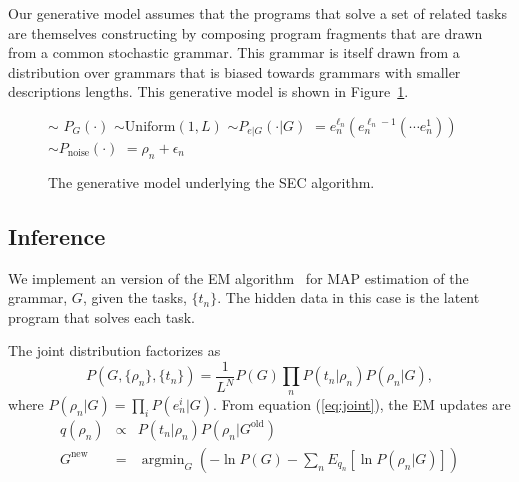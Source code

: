 \documentclass{article} %
\begin{document}
Our generative model assumes that the programs that solve a set of related tasks are themselves constructing by composing program fragments that are drawn from a common stochastic grammar. This grammar is itself drawn from a distribution over grammars that is biased towards grammars with smaller descriptions lengths. This generative model is shown in Figure~\ref{ref:gm}.

\begin{figure}
\begin{codebox}
 $\sim$ $P_G(\cdot)$ 
\li {} $\sim\mbox{Uniform}(1, L)$ 
\li {}
\li {} $\sim P_{e|G}(\cdot | G)$
\li {} $= e_n^{\ell_n} (e_n^{\ell_n-1} ( \cdots e_n^{1}))$
\li {}
\li {} $\sim P_{\mbox{noise}}(\cdot)$
\li {} $= \rho_n + \epsilon_n$
\end{codebox}
\caption{The generative model underlying the SEC algorithm. \label{ref:gm}}
\end{figure}

\subsection{Inference}
We implement an version of the EM algorithm~\cite{dempster:1977} for MAP estimation of the grammar, $G$, given the tasks, $\{t_n\}$. The hidden data in this case is the latent program that solves each task.

The joint distribution factorizes as
\begin{equation}
P(G,\{\rho_n\},\{t_n\}) = \frac{1}{L^N} P(G) \prod_n P(t_n | \rho_n) P(\rho_n | G),
\label{eq:joint}
\end{equation}
where $P(\rho_n | G) = \prod_i P(e^i_n | G)$.
From equation (\ref{eq:joint}), the EM updates are
\begin{eqnarray}
q(\rho_n) &\propto& P(t_n | \rho_n) P(\rho_n | G^{\text{old}})\\
\label{eq:qdist}
G^{\text{new}} &=& \operatorname{argmin}_G \left( -\ln P(G) -
\sum_n 
E_{q_n}
 \left[ \ln P(\rho_n | G) \right] \right)
 \label{eq:gmax}
\end{eqnarray}
\end{document}

